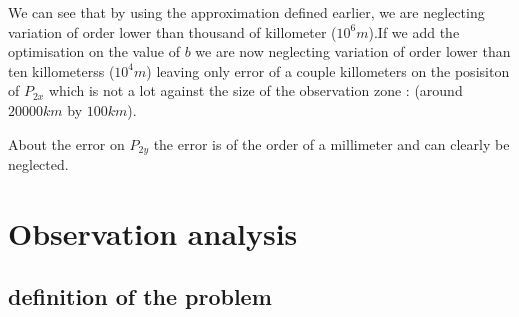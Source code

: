 \documentclass[11pt]{article} %
\begin{document}
		
		We can see that by using the approximation defined earlier, we are neglecting variation of order lower than thousand of killometer ($10^6 m$).If we add the optimisation on the value of $b$ we are now neglecting variation of order lower than ten killometerss ($10^4 m$) leaving only error of a couple killometers on the  posisiton of $P_{2x}$ which is not a lot against the size of the observation zone : (around $ 20000 km $ by $100 km$).
		
		About the error on $P_{2y}$ the error is of the order of a millimeter and can clearly be neglected.
		
		
		
		
		
		
		\newpage
		\section{Observation analysis}
		
		\subsection{definition of the problem}
		
\end{document}

